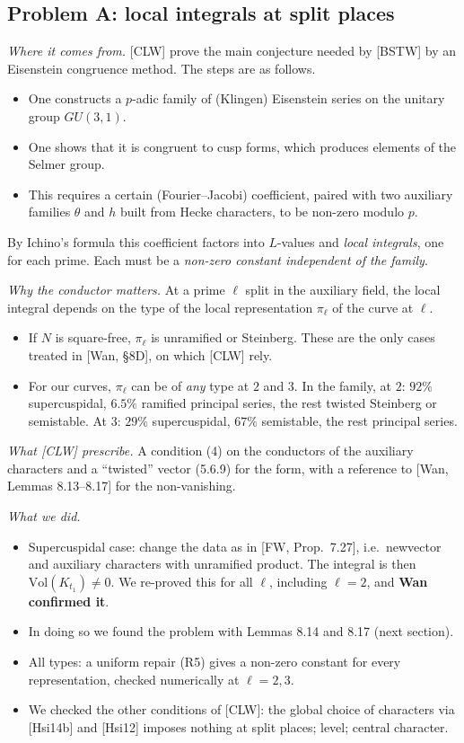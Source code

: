 \documentclass[11pt]{amsart}
\newcommand{\Vol}{\mathrm{Vol}}
\begin{document}
\subsection*{Problem A: local integrals at split places}
\emph{Where it comes from.} [CLW] prove the main conjecture needed by [BSTW] by an Eisenstein congruence method. The steps are as follows.
\begin{itemize}
\item One constructs a $p$-adic family of (Klingen) Eisenstein series on the unitary group $GU(3,1)$.
\item One shows that it is congruent to cusp forms, which produces elements of the Selmer group.
\item This requires a certain (Fourier--Jacobi) coefficient, paired with two auxiliary families $\theta$ and $h$ built from Hecke characters, to be non-zero modulo $p$.
\end{itemize}
By Ichino's formula this coefficient factors into $L$-values and \emph{local integrals}, one for each prime. Each must be a \emph{non-zero constant independent of the family}.

\emph{Why the conductor matters.} At a prime $\ell$ split in the auxiliary field, the local integral depends on the type of the local representation $\pi_\ell$ of the curve at $\ell$.
\begin{itemize}
\item If $N$ is square-free, $\pi_\ell$ is unramified or Steinberg. These are the only cases treated in [Wan, \S8D], on which [CLW] rely.
\item For our curves, $\pi_\ell$ can be of \emph{any} type at $2$ and $3$. In the family, at $2$: $92\%$ supercuspidal, $6.5\%$ ramified principal series, the rest twisted Steinberg or semistable. At $3$: $29\%$ supercuspidal, $67\%$ semistable, the rest principal series.
\end{itemize}

\emph{What [CLW] prescribe.} A condition (4) on the conductors of the auxiliary characters and a ``twisted'' vector (5.6.9) for the form, with a reference to [Wan, Lemmas 8.13--8.17] for the non-vanishing.

\emph{What we did.}
\begin{itemize}
\item Supercuspidal case: change the data as in [FW, Prop.~7.27], i.e.\ newvector and auxiliary characters with unramified product. The integral is then $\Vol(K_{t_1})\neq0$. We re-proved this for all $\ell$, including $\ell=2$, and \textbf{Wan confirmed it}.
\item In doing so we found the problem with Lemmas 8.14 and 8.17 (next section).
\item All types: a uniform repair (R5) gives a non-zero constant for every representation, checked numerically at $\ell=2,3$.
\item We checked the other conditions of [CLW]: the global choice of characters via [Hsi14b] and [Hsi12] imposes nothing at split places; level; central character.
\end{itemize}
\end{document}
